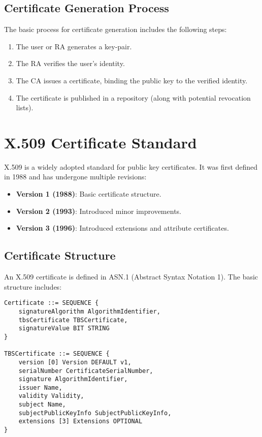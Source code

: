 \subsection{Certificate Generation Process}
The basic process for certificate generation includes the following steps:
\begin{enumerate}
    \item The user or RA generates a key-pair.
    \item The RA verifies the user’s identity.
    \item The CA issues a certificate, binding the public key to the verified identity.
    \item The certificate is published in a repository (along with potential revocation lists).
\end{enumerate}

\section{X.509 Certificate Standard}
X.509 is a widely adopted standard for public key certificates. It was first defined in 1988 and has undergone multiple revisions:
\begin{itemize}
    \item \textbf{Version 1 (1988)}: Basic certificate structure.
    \item \textbf{Version 2 (1993)}: Introduced minor improvements.
    \item \textbf{Version 3 (1996)}: Introduced extensions and attribute certificates.
\end{itemize}

\subsection{Certificate Structure}
An X.509 certificate is defined in ASN.1 (Abstract Syntax Notation 1). The basic structure includes:
\begin{verbatim}
Certificate ::= SEQUENCE {
    signatureAlgorithm AlgorithmIdentifier,
    tbsCertificate TBSCertificate,
    signatureValue BIT STRING
}

TBSCertificate ::= SEQUENCE {
    version [0] Version DEFAULT v1,
    serialNumber CertificateSerialNumber,
    signature AlgorithmIdentifier,
    issuer Name,
    validity Validity,
    subject Name,
    subjectPublicKeyInfo SubjectPublicKeyInfo,
    extensions [3] Extensions OPTIONAL
}
\end{verbatim}

